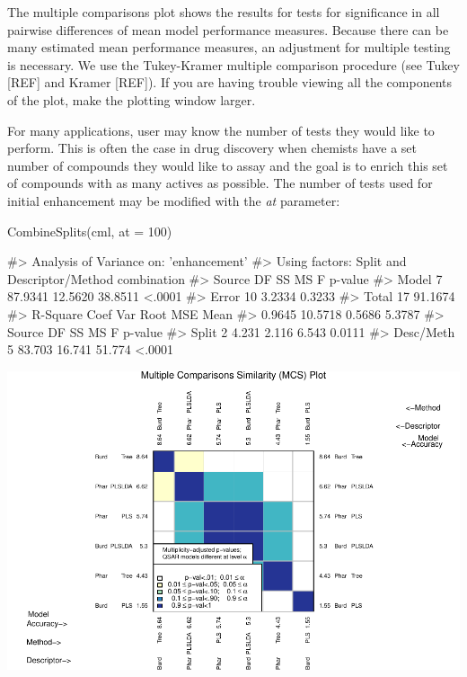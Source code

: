 The multiple comparisons plot shows the results for tests for
significance in all pairwise differences of mean model performance
measures. Because there can be many estimated mean performance measures,
an adjustment for multiple testing is necessary. We use the Tukey-Kramer
multiple comparison procedure (see Tukey {[}REF{]} and Kramer
{[}REF{]}). If you are having trouble viewing all the components of the
plot, make the plotting window larger.

For many applications, user may know the number of tests they would like
to perform. This is often the case in drug discovery when chemists have
a set number of compounds they would like to assay and the goal is to
enrich this set of compounds with as many actives as possible. The
number of tests used for initial enhancement may be modified with the
\emph{at} parameter:

\begin{Schunk}
\begin{Sinput}
CombineSplits(cml, at = 100)
\end{Sinput}
\begin{Soutput}
#>    Analysis of Variance on: 'enhancement'
#>  Using factors: Split and Descriptor/Method combination
#> Source    DF        SS        MS         F   p-value   
#> Model      7   87.9341   12.5620   38.8511    <.0001   
#> Error     10    3.2334    0.3233   
#> Total     17   91.1674   
#>       R-Square   Coef Var   Root MSE       Mean   
#>         0.9645    10.5718     0.5686     5.3787   
#> Source       DF       SS       MS        F   p-value   
#> Split         2    4.231    2.116    6.543    0.0111   
#> Desc/Meth     5   83.703   16.741   51.774    <.0001
\end{Soutput}

\includegraphics{chemmodlabRJournal_files/figure-latex/CombineSplits_ie_100-1} \end{Schunk}

